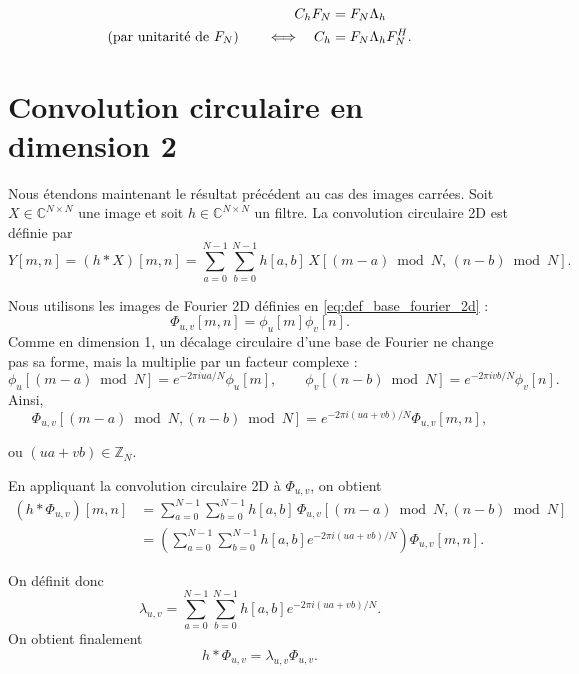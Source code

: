 \begin{align}
C_h F_N &= F_N \Lambda_h \notag \\
\text{(par unitarité de \(F_N\))}\qquad
\Longleftrightarrow\quad
C_h &= F_N \Lambda_h F_N^H.
\end{align}

\section{Convolution circulaire en dimension 2}
\label{sec:convolution-circulaire-2d}

Nous étendons maintenant le résultat précédent au cas des images carrées. Soit
$X\in\mathbb{C}^{N\times N}$ une image et soit
$h\in\mathbb{C}^{N\times N}$ un filtre. La convolution circulaire 2D est définie par
\begin{equation}
    Y[m,n]
    =
    (h * X)[m,n]
    =
    \sum_{a=0}^{N-1}
    \sum_{b=0}^{N-1}
    h[a,b]\,
    X[(m-a)\bmod N,\,(n-b)\bmod N].
    \label{eq:def_convolution_circulaire_2d}
\end{equation}

Nous utilisons les images de Fourier 2D définies en \eqref{eq:def_base_fourier_2d} :
\[
    \Phi_{u,v}[m,n]
    =
    \phi_u[m]\phi_v[n].
\]
Comme en dimension 1, un décalage circulaire d'une base de Fourier ne change pas sa forme, mais la
multiplie par un facteur complexe :
\[
    \phi_u[(m-a)\bmod N]
    =
    e^{-2\pi iua/N}\phi_u[m],
    \qquad
    \phi_v[(n-b)\bmod N]
    =
    e^{-2\pi ivb/N}\phi_v[n].
\]
Ainsi,
\[
    \Phi_{u,v}[(m-a)\bmod N,(n-b)\bmod N]
    =
    e^{-2\pi i(ua+vb)/N}
    \Phi_{u,v}[m,n],
\]

ou $(ua + vb) \in \mathbb{Z}_N$.

En appliquant la convolution circulaire 2D à $\Phi_{u,v}$, on obtient
\begin{align}
(h * \Phi_{u,v})[m,n]
&=
\sum_{a=0}^{N-1}
\sum_{b=0}^{N-1}
h[a,b]\,
\Phi_{u,v}[(m-a)\bmod N,(n-b)\bmod N]
\nonumber \\
&=
\left(
\sum_{a=0}^{N-1}
\sum_{b=0}^{N-1}
h[a,b]e^{-2\pi i(ua+vb)/N}
\right)
\Phi_{u,v}[m,n].
\end{align}

On définit donc
\begin{equation}
    \lambda_{u,v}
    =
    \sum_{a=0}^{N-1}
    \sum_{b=0}^{N-1}
    h[a,b]e^{-2\pi i(ua+vb)/N}.
    \label{eq:valeur_propre_convolution_2d}
\end{equation}
On obtient finalement
\begin{equation}
    h * \Phi_{u,v}
    =
    \lambda_{u,v}\Phi_{u,v}.
    \label{eq:fourier_fonction_propre_conv_2d}
\end{equation}

